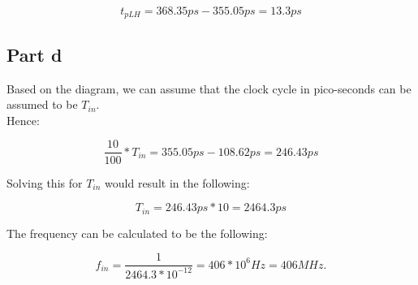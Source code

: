 \documentclass{article}
\begin{document}
\begin{equation}
    t_{pLH} = 368.35ps - 355.05ps = 13.3ps
\end{equation}

\subsection*{Part d}
Based on the diagram, we can assume that the clock cycle in pico-seconds can be assumed to be $T_{in}$.
\\Hence:

\begin{equation}
    \frac{10}{100} * T_{in} = 355.05ps - 108.62ps = 246.43 ps
\end{equation}

Solving this for $T_{in}$ would result in the following:

\begin{equation}
    T_{in} = 246.43 ps * 10 = 2464.3ps
\end{equation}

The frequency can be calculated to be the following:

\begin{equation}
    f_{in} = \frac{1}{2464.3 * 10^{-12}} = 406 * 10^{6} Hz = 406MHz.
\end{equation}
\end{document}
